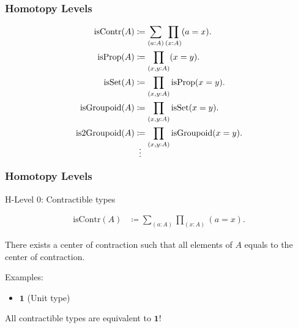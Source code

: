 \documentclass[9pt]{beamer}
\begin{document}
\begin{frame}
\frametitle{Homotopy Levels}

\begin{align*}
  \text{isContr}(A) & \coloneqq \sum_{(a:A)} \prod_{(x:A)} (a = x).
  \\
  \text{isProp}(A) & \coloneqq \prod_{(x,y:A)} (x = y).
  \\
  \text{isSet}(A) & \coloneqq \prod_{(x,y:A)} \text{isProp}(x = y).
  \\
  \text{isGroupoid}(A) & \coloneqq \prod_{(x,y:A)} \text{isSet}(x = y).
  \\
  \text{is2Groupoid}(A) & \coloneqq \prod_{(x,y:A)} \text{isGroupoid}(x = y).
  \\
  \shortvdotswithin{=}
\end{align*}

\end{frame}

\begin{frame}
\frametitle{Homotopy Levels}

H-Level 0: Contractible types

\begin{align*}
  \text{isContr}(A) & \coloneqq \sum_{(a:A)} \prod_{(x:A)} (a = x).
\end{align*}

There exists a center of contraction such that all elements of $A$ equals to
the center of contraction.

Examples:
\begin{itemize}
  \item $\mathbf{1}$ (Unit type)
\end{itemize}

All contractible types are equivalent to $\mathbf{1}$!

\end{frame}
\end{document}

